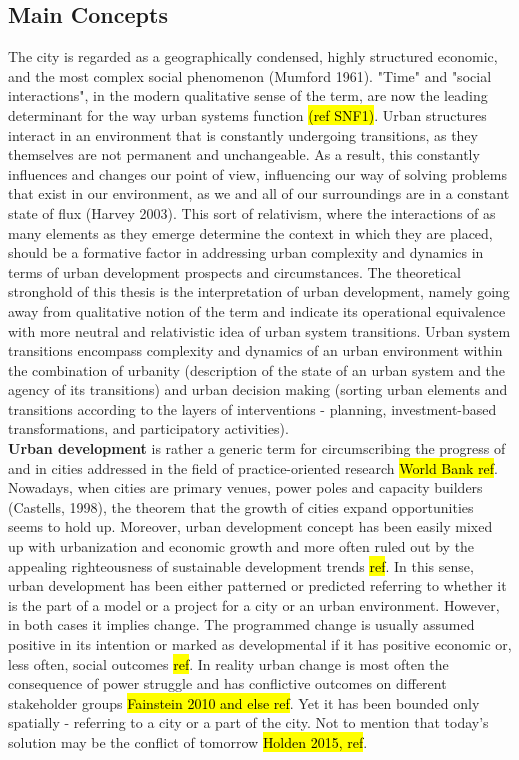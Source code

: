 \documentclass[11pt]{report}
\begin{document}
\subsection{Main Concepts}
The city is regarded as a geographically condensed, highly structured economic, and the most complex social phenomenon (Mumford 1961). "Time" and "social interactions", in the modern qualitative sense of the term, are now the leading determinant for the way urban systems function \hl{(ref SNF1)}. Urban structures interact in an environment that is constantly undergoing transitions, as they themselves are not permanent and unchangeable. As a result, this constantly influences and changes our point of view, influencing our way of solving problems that exist in our environment, as we and all of our surroundings are in a constant state of flux (Harvey 2003). This sort of relativism, where the interactions of as many elements as they emerge determine the context in which they are placed, should be a formative factor in addressing urban complexity and dynamics in terms of urban development prospects and circumstances. The theoretical stronghold of this thesis is the interpretation of urban development, namely going away from qualitative notion of the term and indicate its operational equivalence with more neutral and relativistic idea of urban system transitions. Urban system transitions encompass complexity and dynamics of an urban environment within the combination of urbanity (description of the state of an urban system and the agency of its transitions) and urban decision making (sorting urban elements and transitions according to the layers of interventions - planning, investment-based transformations, and participatory activities).
\\ 
\textbf{Urban development} is rather a generic term for circumscribing the progress of and in cities addressed in the  field of practice-oriented research \hl{World Bank ref}. Nowadays, when cities are primary venues, power poles and capacity builders (Castells, 1998), the theorem that the growth of cities expand opportunities seems to hold up. Moreover, urban development concept has been easily mixed up with urbanization and economic growth and more often ruled out by the appealing righteousness of sustainable development trends \hl{ref}.  In this sense, urban development has been either patterned or predicted referring to whether it is the part of a model or a project for a city or an urban environment. However, in both cases it implies change. The programmed change is usually assumed positive in its intention or marked as developmental if it has positive economic or, less often, social outcomes \hl{ref}. In reality urban change is most often the consequence of power struggle and has conflictive outcomes on different stakeholder groups \hl{Fainstein 2010 and else ref}. Yet it has been bounded only spatially - referring to a city or a part of the city. Not to mention that today's solution may be the conflict of tomorrow \hl{Holden 2015, ref}.
\end{document}
